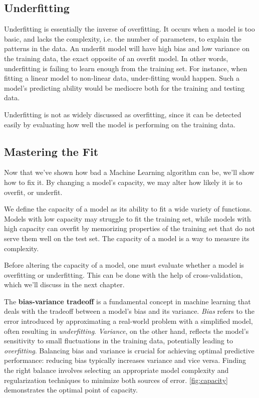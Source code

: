 \documentclass{article}
\begin{document}
\subsection{Underfitting}%
  \label{sub:Underfitting}
  Underfitting is essentially the inverse of overfitting. It occurs when a model is too basic, and lacks the complexity, i.e. the number of parameters, to explain the patterns in the data. An underfit model will have high bias and low variance on the training data, the exact opposite of an overfit model. In other words, underfitting is failing to learn enough from the training set. For instance, when fitting a linear model to non-linear data, under-fitting would happen. Such a model's predicting ability would be mediocre both for the training and testing data.

  Underfitting is not as widely discussed as overfitting, since it can be detected easily by evaluating how well the model is performing on the training data. 

 \subsection{Mastering the Fit}%
  \label{sub:Mastering the Fit}
  Now that we've shown how bad a Machine Learning algorithm can be, we'll show how to fix it. By changing a model's capacity, we may alter how likely it is to overfit, or underfit. 
  \begin{definition}[Capacity]
   We define the capacity of a model as its ability to fit a wide variety of
functions. Models with low capacity may struggle to fit the training set, while models
with high capacity can overfit by memorizing properties of the training set that do
not serve them well on the test set. The capacity of a model is a way to measure its complexity.
  \end{definition}

  Before altering the capacity of a model, one must evaluate whether a model is overfitting or underfitting. This can be done with the help of cross-validation, which we'll discuss in the next chapter. 

The \textbf{bias-variance tradeoff} is a fundamental concept in machine learning that deals with the tradeoff between a model's bias and its variance. \textit{Bias} refers to the error introduced by approximating a real-world problem with a simplified model, often resulting in \textit{underfitting}. \textit{Variance}, on the other hand, reflects the model's sensitivity to small fluctuations in the training data, potentially leading to \textit{overfitting}. Balancing bias and variance is crucial for achieving optimal predictive performance: reducing bias typically increases variance and vice versa. Finding the right balance involves selecting an appropriate model complexity and regularization techniques to minimize both sources of error. \autoref{fig:capacity} demonstrates the optimal point of capacity. 
\end{document}

